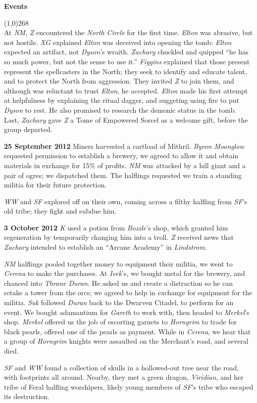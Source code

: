 \documentclass[letterpaper]{article}
\newcommand{\colline}{\line(1,0){268} \\}
\newcommand{\e}[1]{\emph{#1}}
\newcommand{\B}[1]{\textbf{#1}}
\newenvironment{notesection}[1]
{ {\huge \B{#1}} \par
\vspace{-0.75em}
\colline
\begingroup\fontsize{9pt}{12pt}\selectfont}
{\endgroup}
\begin{document}
\begin{notesection}{Events}
At \e{NM}, \e{Z} encountered the \e{North Circle} for the first time. \e{Elton} was abrasive, but not hostile. \e{XG} explained \e{Elton} was deceived into opening the tomb: \emph{Elton} expected an artifact, not \e{Dyson}'s wraith.  \e{Zachary} chuckled and quipped ``he has so much power, but not the sense to use it.'' \e{Figgins} explained that those present represent the spellcasters in the North; they seek to identify and educate talent, and to protect the North from aggression. They invited \e{Z} to join them, and although was reluctant to trust \e{Elton}, he accepted. \e{Elton} made his first attempt at helpfulness by explaining the ritual dagger, and suggeting using fire to put \e{Dyson} to rest. He also promised to research the demonic statue in the tomb.  Last, \e{Zachary} gave \e{Z} a Tome of Empowered Sorcel as a welcome gift, before the group departed.

\B{25 September 2012} Miners harvested a cartload of Mithril. \e{Byron Moonglow} requested permission to establish a brewery, we agreed to allow it and obtain materials in exchange for 15\% of profits. \e{NM} was attacked by a hill giant and a pair of ogres; we dispatched them. The halflings requested we train a standing militia for their future protection.

\e{WW} and \e{SF} explored off on their own, coming across a filthy halfling from \e{SF}'s old tribe; they fight and subdue him.

\B{3 October 2012} \e{K} used a potion from \e{Bozzle}'s shop, which granted him regeneration by temporarily changing him into a troll. \e{Z} received news that \e{Zachary} intended to establish an ``Arcane Academy'' in \e{Lindstrom}.

\e{NM} halflings pooled together money to equipment their militia, we went to \e{Cerena} to make the purchases. At \e{Ivek}'s, we bought metal for the brewery, and chanced into \e{Thrane Duran}. He asked us and create a distraction so he can retake a tower from the orcs; we agreed to help in exchange for equipment for the militia. \e{Suk} followed \e{Duran} back to the Dwarven Citadel, to perform for an event. We bought adamantium for \e{Gareth} to work with, then headed to \e{Merkel}'s shop. \e{Merkel} offered us the job of escorting garnets to \e{Horngrim} to trade for black pearls, offered one of the pearls as payment. While in \e{Cerena}, we hear that a group of \e{Horngrim} knights were assaulted on the Merchant's road, and several died.

\e{SF} and \e{WW} found a collection of skulls in a hollowed-out tree near the road, with footprints all around. Nearby, they met a green dragon, \e{Viridian}, and her tribe of Feral halfling worshipers, likely young members of \e{SF}'s tribe who escaped its destruction.


\end{notesection}
\end{document}
